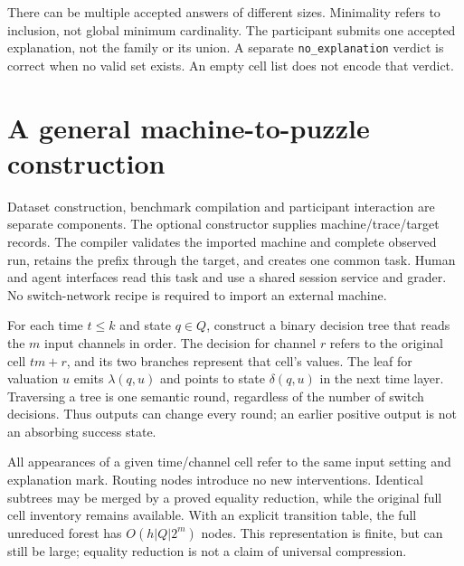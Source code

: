 \documentclass[11pt]{article}
\begin{document}
There can be multiple accepted answers of different sizes. Minimality refers
to inclusion, not global minimum cardinality. The participant submits one
accepted explanation, not the family or its union. A separate
\texttt{no\_explanation} verdict is correct when no valid set exists.
An empty cell list does not encode that verdict.

\section{A general machine-to-puzzle construction}
Dataset construction, benchmark compilation and participant interaction are
separate components. The optional constructor supplies machine/trace/target
records. The compiler validates the imported machine and complete observed run,
retains the prefix through the target, and creates one common task. Human and
agent interfaces read this task and use a shared session service and grader.
No switch-network recipe is required to import an external machine.

For each time $t\leq k$ and state $q\in Q$, construct a binary decision tree that
reads the $m$ input channels in order. The decision for channel $r$ refers to
the original cell $tm+r$, and its two branches represent that cell's values.
The leaf for valuation $u$ emits $\lambda(q,u)$ and points to state
$\delta(q,u)$ in the next time layer. Traversing a tree is one semantic round,
regardless of the number of switch decisions. Thus outputs can change every
round; an earlier positive output is not an absorbing success state.

All appearances of a given time/channel cell refer to the same input setting and
explanation mark. Routing nodes introduce no new interventions. Identical
subtrees may be merged by a proved equality reduction, while the original full
cell inventory remains available. With an explicit transition table, the full
unreduced forest has $O(h|Q|2^m)$ nodes. This representation is finite, but can
still be large; equality reduction is not a claim of universal compression.
\end{document}
